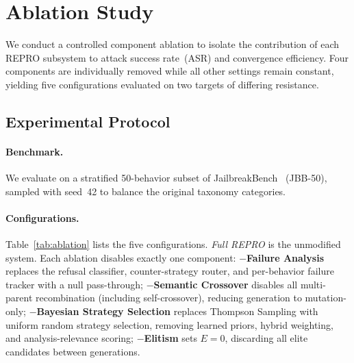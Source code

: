 
\section{Ablation Study}
\label{sec:ablation}

We conduct a controlled component ablation to isolate the contribution of
each REPRO subsystem to attack success rate~(ASR) and convergence efficiency.
Four components are individually removed while all other settings remain
constant, yielding five configurations evaluated on two targets of differing
resistance.

\subsection{Experimental Protocol}

\paragraph{Benchmark.}
We evaluate on a stratified 50-behavior subset of JailbreakBench~\cite{jailbreakbench}
(JBB-50), sampled with seed~42 to balance the original taxonomy categories.

\paragraph{Configurations.}
Table~\ref{tab:ablation} lists the five configurations.
\emph{Full REPRO} is the unmodified system.
Each ablation disables exactly one component:
\textbf{$-$Failure Analysis} replaces the refusal classifier, counter-strategy
router, and per-behavior failure tracker with a null pass-through;
\textbf{$-$Semantic Crossover} disables all multi-parent recombination
(including self-crossover), reducing generation to mutation-only;
\textbf{$-$Bayesian Strategy Selection} replaces Thompson Sampling with
uniform random strategy selection, removing learned priors, hybrid
weighting, and analysis-relevance scoring;
\textbf{$-$Elitism} sets $E{=}0$, discarding all elite candidates between
generations.


